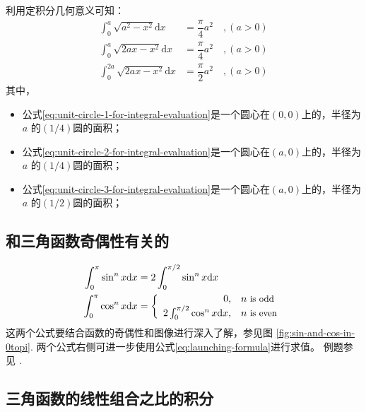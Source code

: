 利用定积分几何意义可知：
\begin{align}
    \int_0^{a}  \sqrt{a^2 - x^2} \mathrm dx &= \dfrac{\pi}{4} a^2 \quad,(a > 0) \label{eq:unit-circle-1-for-integral-evaluation}\\
    \int_0^{a}  \sqrt{2ax - x^2} \mathrm dx &= \dfrac{\pi}{4} a^2 \quad,(a > 0) \label{eq:unit-circle-2-for-integral-evaluation}\\
    \int_0^{2a} \sqrt{2ax - x^2} \mathrm dx &= \dfrac{\pi}{2} a^2 \quad,(a > 0) \label{eq:unit-circle-3-for-integral-evaluation}
\end{align}
其中，
\begin{itemize}
    \item 公式\ref{eq:unit-circle-1-for-integral-evaluation}是一个圆心在$(0, 0)$上的，半径为 $a$ 的$(1/4)$圆的面积；
    \item 公式\ref{eq:unit-circle-2-for-integral-evaluation}是一个圆心在$(a, 0)$上的，半径为 $a$ 的$(1/4)$圆的面积；
    \item 公式\ref{eq:unit-circle-3-for-integral-evaluation}是一个圆心在$(a, 0)$上的，半径为 $a$ 的$(1/2)$圆的面积；
\end{itemize}

\subsection{和三角函数奇偶性有关的}

\begin{align}
    \int_0^{\pi} \sin^n x \mathrm{d}x &= 2 \int_0^{\pi/2} \sin^n x \mathrm{d}x \\
    \int_0^{\pi} \cos^n x \mathrm{d}x &= 
    \left\{
        \begin{array}{rl}
            0,                                       &n \mbox{\small \ is odd} \\
            2 \int_{0}^{\pi/2} \cos^n x \mathrm{d}x, &n \mbox{\small \ is even}
        \end{array}
    \right.
\end{align}
这两个公式要结合函数的奇偶性和图像进行深入了解，参见图 
\ref{fig:sin-and-cos-in-0topi}.
两个公式右侧可进一步使用公式\ref{eq:launching-formula}进行求值。
例题参见 \cite[page 108, pdf 119, exmaple 3]{we}.

\subsection{三角函数的线性组合之比的积分}

